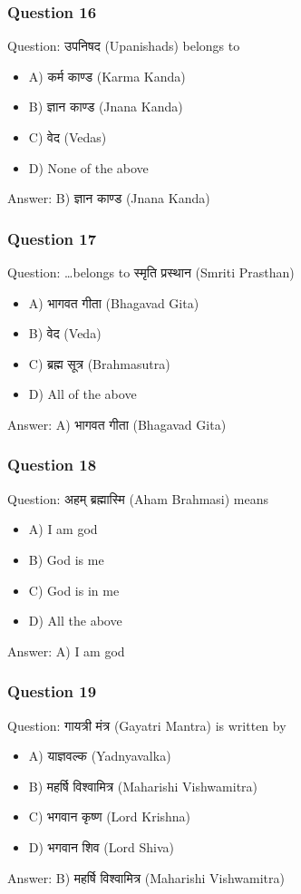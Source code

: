 \begin{frame}[fragile]\frametitle{Question 16}
Question: उपनिषद (Upanishads) belongs to
\begin{itemize}
\item A) कर्म काण्ड (Karma Kanda)
\item B) ज्ञान काण्ड (Jnana Kanda)
\item C) वेद (Vedas)
\item D) None of the above
\end{itemize}
Answer: B) ज्ञान काण्ड (Jnana Kanda)
\end{frame}

\begin{frame}[fragile]\frametitle{Question 17}
Question: \ldots belongs to स्मृति प्रस्थान (Smriti Prasthan)
\begin{itemize}
\item A) भागवत गीता (Bhagavad Gita)
\item B) वेद (Veda)
\item C) ब्रह्म सूत्र (Brahmasutra)
\item D) All of the above
\end{itemize}
Answer: A) भागवत गीता (Bhagavad Gita)
\end{frame}

\begin{frame}[fragile]\frametitle{Question 18}
Question: अहम् ब्रह्मास्मि (Aham Brahmasi) means
\begin{itemize}
\item A) I am god
\item B) God is me
\item C) God is in me
\item D) All the above
\end{itemize}
Answer: A) I am god
\end{frame}

\begin{frame}[fragile]\frametitle{Question 19}
Question: गायत्री मंत्र (Gayatri Mantra) is written by
\begin{itemize}
\item A) याज्ञवल्क (Yadnyavalka)
\item B) महर्षि विश्वामित्र (Maharishi Vishwamitra)
\item C) भगवान कृष्ण (Lord Krishna)
\item D) भगवान शिव (Lord Shiva)
\end{itemize}
Answer: B) महर्षि विश्वामित्र (Maharishi Vishwamitra)
\end{frame}

